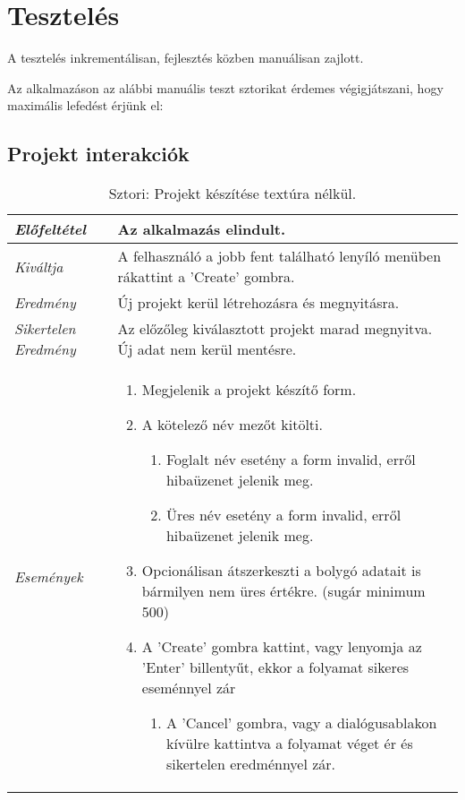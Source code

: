 \chapter{Tesztelés}
\label{ch:intro}

A tesztelés inkrementálisan, fejlesztés közben manuálisan zajlott.

Az alkalmazáson az alábbi manuális teszt sztorikat érdemes végigjátszani, hogy maximális lefedést érjünk el:

\section{Projekt interakciók}

\begin{table}[H]
	\centering
	\begin{tabular}{ | m{} | m{} | }
		\hline
		\emph{Előfeltétel} & Az alkalmazás elindult.  \\
		\hline
		\emph{Kiváltja} & A felhasználó a jobb fent található lenyíló menüben rákattint a 'Create' gombra. \\
		\hline
		\emph{Eredmény} & Új projekt kerül létrehozásra és megnyitásra.  \\
		\hline
		\emph{Sikertelen Eredmény} & Az előzőleg kiválasztott projekt marad megnyitva. Új adat nem kerül mentésre.  \\
		\hline
		\hline
		\emph{Események} &

		\begin{enumerate}[itemsep=-1ex]
			\item Megjelenik a projekt készítő form.
			\item A kötelező név mezőt kitölti.
			\begin{enumerate}[itemsep=-1ex]
				\item Foglalt név esetény a form invalid, erről hibaüzenet jelenik meg.
				\item Üres név esetény a form invalid, erről hibaüzenet jelenik meg.
			\end{enumerate}
			\item Opcionálisan átszerkeszti a bolygó adatait is bármilyen nem üres értékre. (sugár minimum 500)
			\item A 'Create' gombra kattint, vagy lenyomja az 'Enter' billentyűt, ekkor a folyamat sikeres eseménnyel zár
			\begin{enumerate}[itemsep=-1ex]
				\item A 'Cancel' gombra, vagy a dialógusablakon kívülre kattintva a folyamat véget ér és sikertelen eredménnyel zár.
			\end{enumerate}
		\end{enumerate}

		\\
		\hline
	\end{tabular}
	\caption{Sztori: Projekt készítése textúra nélkül.}
	\label{tab:story-project-create}
\end{table}

